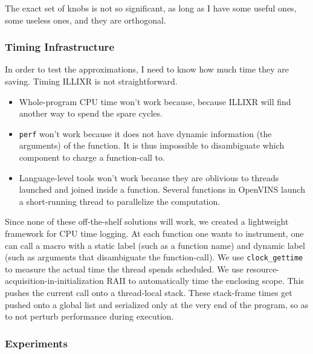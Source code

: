 

The exact set of knobs is not so significant, as long as I have some useful ones, some useless ones, and they are orthogonal.

\subsubsection{Timing Infrastructure}

In order to test the approximations, I need to know how much time they are saving. Timing ILLIXR is not straightforward.
\begin{itemize}
\item Whole-program CPU time won't work because, because ILLIXR will find another way to spend the spare cycles.
\item \verb+perf+ won't work because it does not have dynamic information (the arguments) of the function. It is thus impossible to disambiguate which component to charge a function-call to.
\item Language-level tools won't work because they are oblivious to threads launched and joined inside a function. Several functions in OpenVINS launch a short-running thread to parallelize the computation.
\end{itemize}

Since none of these off-the-shelf solutions will work, we created a lightweight framework for CPU time logging. At each function one wants to instrument, one can call a macro with a static label (such as a function name) and dynamic label (such as arguments that disambiguate the function-call). We use \verb+clock_gettime+ to measure the actual time the thread spends scheduled. We use resource-acquisition-in-initialization RAII to automatically time the enclosing scope. This pushes the current call onto a thread-local stack. These stack-frame times get pushed onto a global list and serialized only at the very end of the program, so as to not perturb performance during execution.

\subsubsection{Experiments}

